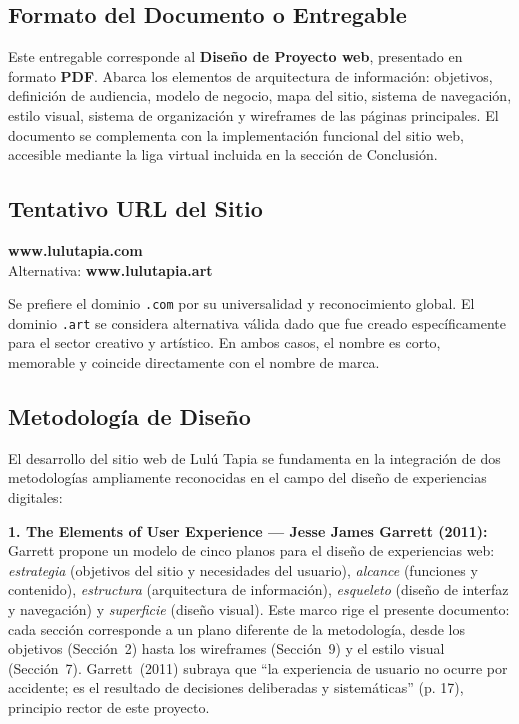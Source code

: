\documentclass[12pt, letterpaper]{article}
\begin{document}
\subsection{Formato del Documento o Entregable}

Este entregable corresponde al \textbf{Diseño de Proyecto web}, presentado en formato \textbf{PDF}. Abarca los elementos de arquitectura de información: objetivos, definición de audiencia, modelo de negocio, mapa del sitio, sistema de navegación, estilo visual, sistema de organización y wireframes de las páginas principales. El documento se complementa con la implementación funcional del sitio web, accesible mediante la liga virtual incluida en la sección de Conclusión.

\subsection{Tentativo URL del Sitio}

\begin{tcolorbox}[
  colback=luluPurple!8, colframe=luluPurple,
  arc=4pt, boxrule=0.8pt,
  left=10pt, right=10pt, top=8pt, bottom=8pt
]
\centering
{\large\bfseries\color{luluPurple} www.lulutapia.com}\\[5pt]
{\small\color{luluMidGray} Alternativa: \textbf{www.lulutapia.art}}
\end{tcolorbox}

Se prefiere el dominio \texttt{.com} por su universalidad y reconocimiento global. El dominio \texttt{.art} se considera alternativa válida dado que fue creado específicamente para el sector creativo y artístico. En ambos casos, el nombre es corto, memorable y coincide directamente con el nombre de marca.

\subsection{Metodología de Diseño}

El desarrollo del sitio web de Lulú Tapia se fundamenta en la integración de dos metodologías ampliamente reconocidas en el campo del diseño de experiencias digitales:

\textbf{1. The Elements of User Experience — Jesse James Garrett (2011):} Garrett propone un modelo de cinco planos para el diseño de experiencias web: \textit{estrategia} (objetivos del sitio y necesidades del usuario), \textit{alcance} (funciones y contenido), \textit{estructura} (arquitectura de información), \textit{esqueleto} (diseño de interfaz y navegación) y \textit{superficie} (diseño visual). Este marco rige el presente documento: cada sección corresponde a un plano diferente de la metodología, desde los objetivos (Sección~2) hasta los wireframes (Sección~9) y el estilo visual (Sección~7). Garrett~(2011) subraya que ``la experiencia de usuario no ocurre por accidente; es el resultado de decisiones deliberadas y sistemáticas'' (p. 17), principio rector de este proyecto.
\end{document}
